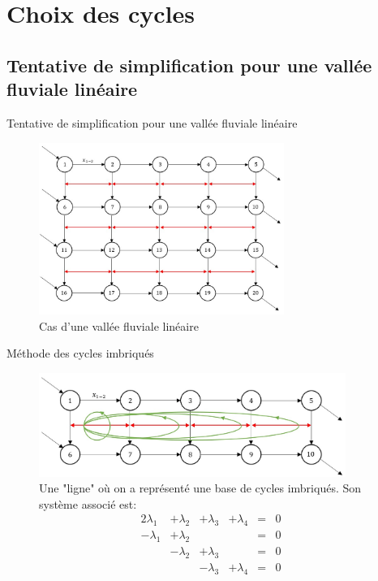 \documentclass{beamer}
\begin{document}
\section{Choix des cycles}
\subsection{Tentative de simplification pour une vallée fluviale linéaire}
\begin{frame}{Tentative de simplification pour une vallée fluviale linéaire}

\begin{figure}[H]
    \centering
    \includegraphics[width = 8cm]{valleelineaire.jpg}
    \caption{Cas d'une vallée fluviale linéaire}
    \label{fig:valleefluvialelineaire}
\end{figure}

\insertframenumber\end{frame}

\begin{frame}{Méthode des cycles imbriqués}

\begin{figure}[H]
    \centering
    \includegraphics[width = 10cm]{Graphe_ligne_cycles.jpg}
    \caption{Une "ligne" où on a représenté une base de cycles imbriqués. Son système associé est: 
    \centering
    $$ \begin{matrix}
            2 \lambda_1  & + \lambda_2  &+ \lambda_3 & + \lambda_4 & = & 0 \\
            - \lambda_1 & + \lambda_2 & & & = & 0 \\
            & - \lambda_2 & + \lambda_3 & & = & 0 \\
            & & - \lambda_3 & + \lambda_4 & = & 0
        \end{matrix} $$
    }
    \label{fig:Uneligne}
\end{figure}
    
\insertframenumber\end{frame}
\end{document}
